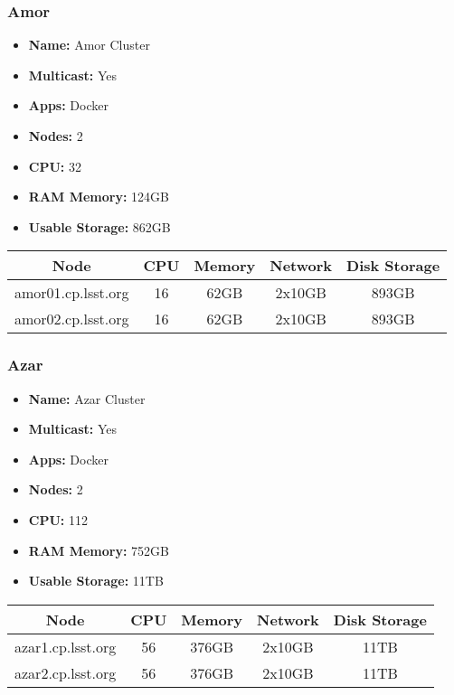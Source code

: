 \newpage
\subsubsection{Amor}
\begin{itemize}
  \itemsep0em 
  \item \textbf{Name:}       Amor Cluster
  \item \textbf{Multicast:}  Yes
  \item \textbf{Apps:}       Docker
  \item \textbf{Nodes:}      2
  \item \textbf{CPU:}        32
  \item \textbf{RAM Memory:} 124GB
  \item \textbf{Usable Storage:}   862GB
\end{itemize}
\begin{center}
  \small
  \begin{tabular}{||c c c c c||}
    \hline
    \textbf{Node} & \textbf{CPU} & \textbf{Memory} & \textbf{Network} & \textbf{Disk Storage} \\ [0.5ex]
    \hline
    amor01.cp.lsst.org & 16 & 62GB & 2x10GB & 893GB \\
    \hline
    amor02.cp.lsst.org & 16 & 62GB & 2x10GB & 893GB \\
    \hline
  \end{tabular}
\end{center}

\subsubsection{Azar}
\begin{itemize}
  \itemsep0em 
  \item \textbf{Name:}       Azar Cluster
  \item \textbf{Multicast:}  Yes
  \item \textbf{Apps:}       Docker
  \item \textbf{Nodes:}      2
  \item \textbf{CPU:}        112
  \item \textbf{RAM Memory:} 752GB
  \item \textbf{Usable Storage:}   11TB
\end{itemize}
\begin{center}
  \small
  \begin{tabular}{||c c c c c||}
    \hline
    \textbf{Node} & \textbf{CPU} & \textbf{Memory} & \textbf{Network} & \textbf{Disk Storage} \\ [0.5ex]
    \hline
    azar1.cp.lsst.org & 56 & 376GB & 2x10GB & 11TB \\
    \hline
    azar2.cp.lsst.org & 56 & 376GB & 2x10GB & 11TB \\
    \hline
  \end{tabular}
\end{center}

